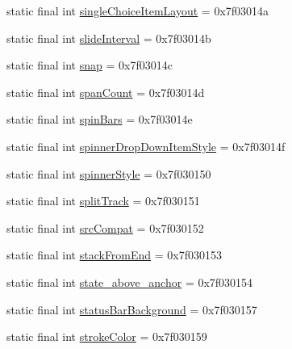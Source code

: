 \begin{DoxyCompactItemize}
\item 
static final int \mbox{\hyperlink{classcom_1_1synnapps_1_1carouselview_1_1_r_1_1attr_a0db8b54fc12fea6c018330505266e125}{single\+Choice\+Item\+Layout}} = 0x7f03014a
\item 
static final int \mbox{\hyperlink{classcom_1_1synnapps_1_1carouselview_1_1_r_1_1attr_afd063d689bb17d7cfc7343f728081e84}{slide\+Interval}} = 0x7f03014b
\item 
static final int \mbox{\hyperlink{classcom_1_1synnapps_1_1carouselview_1_1_r_1_1attr_ae6a5af2120cbe6931d6f99d4f43cb509}{snap}} = 0x7f03014c
\item 
static final int \mbox{\hyperlink{classcom_1_1synnapps_1_1carouselview_1_1_r_1_1attr_a643ed5709a1d956963f7479e438433c9}{span\+Count}} = 0x7f03014d
\item 
static final int \mbox{\hyperlink{classcom_1_1synnapps_1_1carouselview_1_1_r_1_1attr_acc1f83e627b860ced4dae0e73c56f1b6}{spin\+Bars}} = 0x7f03014e
\item 
static final int \mbox{\hyperlink{classcom_1_1synnapps_1_1carouselview_1_1_r_1_1attr_af7f555970f75a7a880c84bf06a90525c}{spinner\+Drop\+Down\+Item\+Style}} = 0x7f03014f
\item 
static final int \mbox{\hyperlink{classcom_1_1synnapps_1_1carouselview_1_1_r_1_1attr_a21c86169af132746b3dc5f32301f4c1d}{spinner\+Style}} = 0x7f030150
\item 
static final int \mbox{\hyperlink{classcom_1_1synnapps_1_1carouselview_1_1_r_1_1attr_a8d59b6ec0d88b8b5eed5d917c011b8aa}{split\+Track}} = 0x7f030151
\item 
static final int \mbox{\hyperlink{classcom_1_1synnapps_1_1carouselview_1_1_r_1_1attr_a5e7a54edb1c52c64f37c3f47504461be}{src\+Compat}} = 0x7f030152
\item 
static final int \mbox{\hyperlink{classcom_1_1synnapps_1_1carouselview_1_1_r_1_1attr_a58191329cf6375c2d178ced55dc878ff}{stack\+From\+End}} = 0x7f030153
\item 
static final int \mbox{\hyperlink{classcom_1_1synnapps_1_1carouselview_1_1_r_1_1attr_a08c582a2e1c4009f9acd0ef0c2ab74fe}{state\+\_\+above\+\_\+anchor}} = 0x7f030154
\item 
static final int \mbox{\hyperlink{classcom_1_1synnapps_1_1carouselview_1_1_r_1_1attr_a5521aa7b2a136dd71c98a7eab82a6337}{status\+Bar\+Background}} = 0x7f030157
\item 
static final int \mbox{\hyperlink{classcom_1_1synnapps_1_1carouselview_1_1_r_1_1attr_a8b370f90495d3495a8a3701eab6968c5}{stroke\+Color}} = 0x7f030159
\item 

\end{DoxyCompactItemize}
